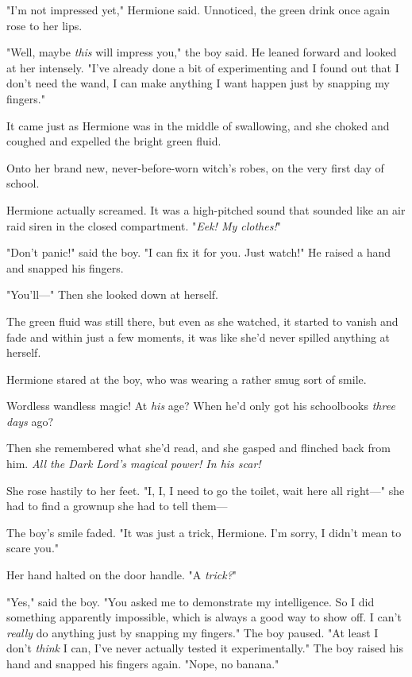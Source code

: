 "I'm not impressed yet," Hermione said. Unnoticed, the green drink once again
rose to her lips.

"Well, maybe \emph{this} will impress you," the boy said. He leaned forward and
looked at her intensely. "I've already done a bit of experimenting and I found
out that I don't need the wand, I can make anything I want happen just by
snapping my fingers."

It came just as Hermione was in the middle of swallowing, and she choked and
coughed and expelled the bright green fluid.

Onto her brand new, never-before-worn witch's robes, on the very first day of school.

Hermione actually screamed. It was a high-pitched sound that sounded like an
air raid siren in the closed compartment. "\emph{Eek! My clothes!}"

"Don't panic!" said the boy. "I can fix it for you. Just watch!" He raised a
hand and snapped his fingers.

"You'll---" Then she looked down at herself.

The green fluid was still there, but even as she watched, it started to vanish
and fade and within just a few moments, it was like she'd never spilled
anything at herself.

Hermione stared at the boy, who was wearing a rather smug sort of smile.

Wordless wandless magic! At \emph{his} age? When he'd only got his
schoolbooks \emph{three days} ago?

Then she remembered what she'd read, and she gasped and flinched back from him.
\emph{All the Dark Lord's magical power! In his scar!}

She rose hastily to her feet. "I, I, I need to go the toilet, wait here all
right---" she had to find a grownup she had to tell them---

The boy's smile faded. "It was just a trick, Hermione. I'm sorry, I didn't mean
to scare you."

Her hand halted on the door handle. "A \emph{trick?}"

"Yes," said the boy. "You asked me to demonstrate my intelligence. So I did
something apparently impossible, which is always a good way to show off. I
can't \emph{really} do anything just by snapping my fingers." The boy paused.
"At least I don't \emph{think} I can, I've never actually tested it
experimentally." The boy raised his hand and snapped his fingers again. "Nope,
no banana."

